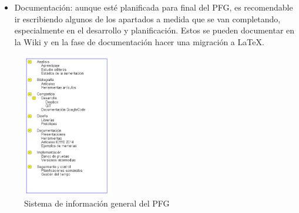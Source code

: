 \begin{itemize}
{La información se distribuye en diferentes carpetas, tratando de mantener un orden estricto con tal de perder el menor tiempo posible en búsqueda de documentos. Se puede observar la estructura de ficheros de la Figura \ref{fig:EstructuraFicheros} entre los que destaca:
 \begin{itemize}
 \item{Bibliografía: documentos de lectura para aprendizaje e investigación.}
 \item{Compartido: ficheros de trabajo compartidos con otros integrantes del grupo. Destacan las carpetas sincronizadas con GIT.}
 \item{Documentación: documentación y agregados a la misma, cómo ejemplos, artículos de WebMakeUp enviados al congreso ICWE, etc.}
 \end{itemize}
 Las carpetas, para garantizar la disponibilidad en cualquier lugar, se almacenan en Dropbox. Esto a su vez ofrece un sistema de respaldo en nube y un control de versiones, que aunque sea muy básico, puede sacar de algún apuro. Para el código fuente (tanto el de WebMakeUp, cómo la memoria escrita en LaTeX) está también respaldado por un control de versiones. WebMakeUp en BitBucket, dado que tiene que ser un proyecto privado (no abierto al público). La memoria utiliza Google Code (Apartado \ref{sec:GoogleCode}). Por último, se hacen backups manuales periódicamente en otro disco duro externo para no tener que depender de las diferentes tecnologías en nube utilizadas.}
\item{Documentación: aunque esté planificada para final del PFG, es recomendable ir escribiendo algunos de los apartados a medida que se van completando, especialmente en el desarrollo y planificación. Estos se pueden documentar en la Wiki y en la fase de documentación hacer una migración a \LaTeX.}
\end{itemize}

\begin{figure}
\begin{center}
\includegraphics[width=0.35\textwidth]{figs/6-EstructuraFicheros.png}
\end{center}
\caption{Sistema de información general del PFG}
\label{fig:EstructuraFicheros}
\end{figure}

